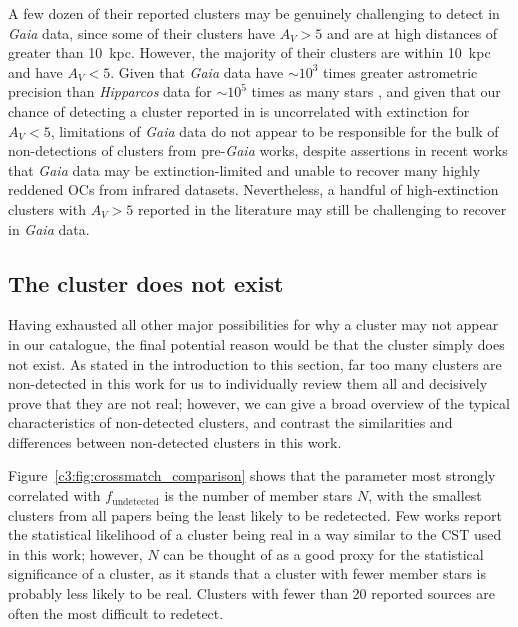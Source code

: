 A few dozen of their reported clusters may be genuinely challenging to detect in \emph{Gaia} data, since some of their clusters have $A_V > 5$ and are at high distances of greater than 10~kpc. However, the majority of their clusters are within 10~kpc and have $A_V < 5$. Given that \emph{Gaia} data have $\sim10^3$ times greater astrometric precision than \emph{Hipparcos} data for $\sim10^5$ times as many stars \citep{gaia_collaboration_gaia_2021}, and given that our chance of detecting a cluster reported in \cite{kharchenko_global_2013} is uncorrelated with extinction for $A_V < 5$, limitations of \emph{Gaia} data do not appear to be responsible for the bulk of non-detections of clusters from pre-\emph{Gaia} works, despite assertions in recent works that \emph{Gaia} data may be extinction-limited and unable to recover many highly reddened OCs from infrared datasets. Nevertheless, a handful of high-extinction clusters with $A_V > 5$ reported in the literature may still be challenging to recover in \emph{Gaia} data.


\subsection{The cluster does not exist}\label{c3:sec:discussion-undetected:cluster-not-real}

Having exhausted all other major possibilities for why a cluster may not appear in our catalogue, the final potential reason would be that the cluster simply does not exist. As stated in the introduction to this section, far too many clusters are non-detected in this work for us to individually review them all and decisively prove that they are not real; however, we can give a broad overview of the typical characteristics of non-detected clusters, and contrast the similarities and differences between non-detected clusters in this work.


Figure~\ref{c3:fig:crossmatch_comparison} shows that the parameter most strongly correlated with $f_\text{undetected}$ is the number of member stars $N$, with the smallest clusters from all papers being the least likely to be redetected. Few works report the statistical likelihood of a cluster being real in a way similar to the CST used in this work; however, $N$ can be thought of as a good proxy for the statistical significance of a cluster, as it stands that a cluster with fewer member stars is probably less likely to be real. Clusters with fewer than 20 reported sources are often the most difficult to redetect. 

